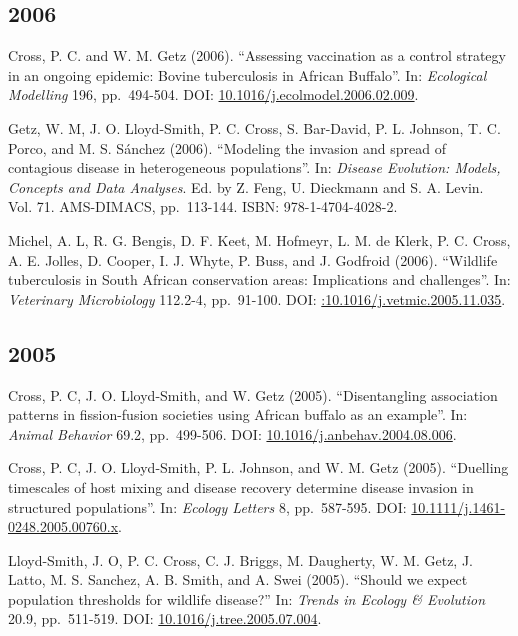 \documentclass[12pt,]{article}
\begin{document}
\hypertarget{section-13}{%
\subsection{2006}\label{section-13}}

Cross, P. C. and W. M. Getz (2006). ``Assessing vaccination as a control
strategy in an ongoing epidemic: Bovine tuberculosis in African
Buffalo''. In: \emph{Ecological Modelling} 196, pp.~494-504. DOI:
\href{https://doi.org/10.1016\%2Fj.ecolmodel.2006.02.009}{10.1016/j.ecolmodel.2006.02.009}.

Getz, W. M, J. O. Lloyd-Smith, P. C. Cross, S. Bar-David, P. L. Johnson,
T. C. Porco, and M. S. Sánchez (2006). ``Modeling the invasion and
spread of contagious disease in heterogeneous populations''. In:
\emph{Disease Evolution: Models, Concepts and Data Analyses}. Ed. by Z.
Feng, U. Dieckmann and S. A. Levin. Vol. 71. AMS-DIMACS, pp.~113-144.
ISBN: 978-1-4704-4028-2.

Michel, A. L, R. G. Bengis, D. F. Keet, M. Hofmeyr, L. M. de Klerk, P.
C. Cross, A. E. Jolles, D. Cooper, I. J. Whyte, P. Buss, and J. Godfroid
(2006). ``Wildlife tuberculosis in South African conservation areas:
Implications and challenges''. In: \emph{Veterinary Microbiology}
112.2-4, pp.~91-100. DOI:
\href{https://doi.org/\%3A10.1016\%2Fj.vetmic.2005.11.035}{:10.1016/j.vetmic.2005.11.035}.

\hypertarget{section-14}{%
\subsection{2005}\label{section-14}}

Cross, P. C, J. O. Lloyd-Smith, and W. Getz (2005). ``Disentangling
association patterns in fission-fusion societies using African buffalo
as an example''. In: \emph{Animal Behavior} 69.2, pp.~499-506. DOI:
\href{https://doi.org/10.1016\%2Fj.anbehav.2004.08.006}{10.1016/j.anbehav.2004.08.006}.

Cross, P. C, J. O. Lloyd-Smith, P. L. Johnson, and W. M. Getz (2005).
``Duelling timescales of host mixing and disease recovery determine
disease invasion in structured populations''. In: \emph{Ecology Letters}
8, pp.~587-595. DOI:
\href{https://doi.org/10.1111\%2Fj.1461-0248.2005.00760.x}{10.1111/j.1461-0248.2005.00760.x}.

Lloyd-Smith, J. O, P. C. Cross, C. J. Briggs, M. Daugherty, W. M. Getz,
J. Latto, M. S. Sanchez, A. B. Smith, and A. Swei (2005). ``Should we
expect population thresholds for wildlife disease?'' In: \emph{Trends in
Ecology \& Evolution} 20.9, pp.~511-519. DOI:
\href{https://doi.org/10.1016\%2Fj.tree.2005.07.004}{10.1016/j.tree.2005.07.004}.
\end{document}
